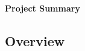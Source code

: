 \documentclass[11pt]{article}
\begin{document}
\noindent
\begin{center} {\bf Project Summary} \end{center}

\medskip
\noindent






\subsection*{Overview}
\end{document}
